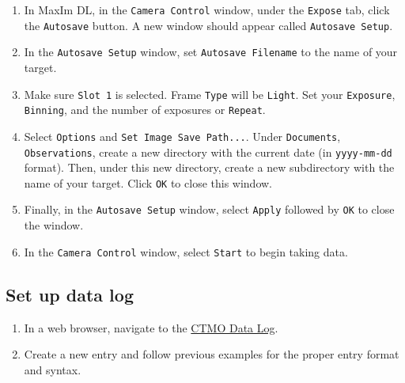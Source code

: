 \documentclass{article}
\begin{document}
	\begin{enumerate}
		
		\item In MaxIm DL, in the \texttt{Camera Control} window, under the \texttt{Expose} tab, click the \texttt{Autosave} button. A new window should appear called \texttt{Autosave Setup}.
		
		\item In the \texttt{Autosave Setup} window, set \texttt{Autosave Filename} to the name of your target.
		
		\item Make sure \texttt{Slot 1} is selected. Frame \texttt{Type} will be \texttt{Light}. Set your \texttt{Exposure}, \texttt{Binning}, and the number of exposures or \texttt{Repeat}.
		
		\item Select \texttt{Options} and \texttt{Set Image Save Path...}. Under \texttt{Documents}, \texttt{Observations}, create a new directory with the current date (in \texttt{yyyy-mm-dd} format). Then, under this new directory, create a new subdirectory with the name of your target. Click \texttt{OK} to close this window.
		
		\item Finally, in the \texttt{Autosave Setup} window, select \texttt{Apply} followed by \texttt{OK} to close the window.
		
		\item In the \texttt{Camera Control} window, select \texttt{Start} to begin taking data.
		
	\end{enumerate}
	
	\subsection{Set up data log}
	\label{sec:set-up-data-log}
	
	\begin{enumerate}
		
		\item In a web browser, navigate to the \href{https://docs.google.com/spreadsheets/d/1-flrFYcHwpuXavXAMwkF41ibTWqWWC0Sgsv5X402HyY/edit?usp=sharing}{CTMO Data Log}.
		
		\item Create a new entry and follow previous examples for the proper entry format and syntax.
		
	\end{enumerate}
	
\end{document}
